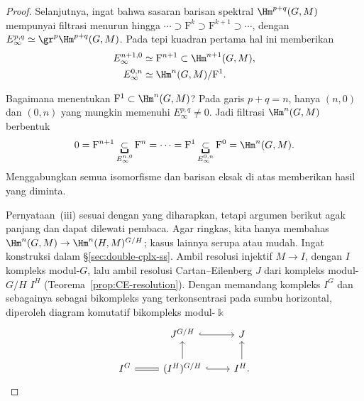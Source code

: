 \begin{proof}
	Selanjutnya, ingat bahwa sasaran barisan spektral
	$\Hm^{p+q}(G,M)$ mempunyai filtrasi menurun hingga
	$\cdots\supset\mathrm{F}^k\supset\mathrm{F}^{k+1}\supset\cdots$, dengan
	$E_\infty^{p,q}\simeq\gr^p\Hm^{p+q}(G,M)$. Pada tepi kuadran pertama hal
	ini memberikan
	\begin{align*}
		E_\infty^{n+1,0}&\simeq\mathrm{F}^{n+1}
		\subset\Hm^{n+1}(G,M),\\
		E_\infty^{0,n}&\simeq\Hm^n(G,M)/\mathrm{F}^1.
	\end{align*}

	Bagaimana menentukan $\mathrm{F}^1\subset\Hm^n(G,M)$? Pada garis
	$p+q=n$, hanya $(n,0)$ dan $(0,n)$ yang mungkin memenuhi
	$E_\infty^{p,q}\neq0$. Jadi filtrasi $\Hm^n(G,M)$ berbentuk
	\[ 0=\mathrm{F}^{n+1}
	\underbracket{\subset}_{E_\infty^{n,0}}\mathrm{F}^n
	=\cdots=\mathrm{F}^1
	\underbracket{\subset}_{E_\infty^{0,n}}\mathrm{F}^0
	=\Hm^n(G,M). \]
	Menggabungkan semua isomorfisme dan barisan eksak di atas memberikan hasil
	yang diminta.

	Pernyataan~(iii) sesuai dengan yang diharapkan, tetapi argumen berikut agak panjang dan
	dapat dilewati pembaca. Agar ringkas, kita hanya membahas
	$\Hm^n(G,M)\to\Hm^n(H,M)^{G/H}$; kasus lainnya serupa atau mudah. Ingat
	konstruksi dalam \S\ref{sec:double-cplx-ss}. Ambil resolusi injektif
	$M\to I$, dengan $I$ kompleks modul-$G$, lalu ambil resolusi
	Cartan--Eilenberg $J$ dari kompleks modul-$G/H$ $I^H$
	(Teorema~\ref{prop:CE-resolution}). Dengan memandang kompleks $I^G$ dan
	sebagainya sebagai bikompleks yang terkonsentrasi pada sumbu horizontal,
	diperoleh diagram komutatif bikompleks modul-$\Bbbk$
	\begin{equation}\label{eqn:LHS-SS-aux}\begin{tikzcd}
		& J^{G/H} \arrow[hookrightarrow,r] & J \\
		I^G \arrow[equal,r] & (I^H)^{G/H}
		\arrow[hookrightarrow,r] \arrow[u] & I^H. \arrow[u]
	\end{tikzcd}\end{equation}


\end{proof}
